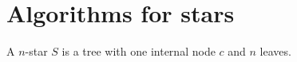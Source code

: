  \section{Algorithms for stars}\label{s.1}
 A $n$-star $S$ is a tree with one internal node $c$ and $n$ leaves.
 
% 
% 
% 

